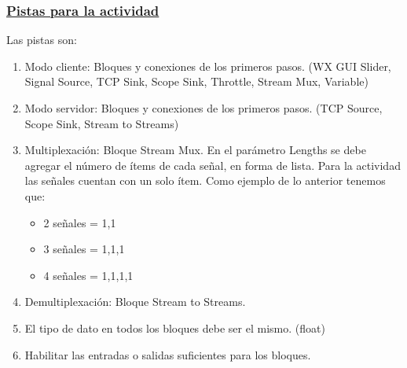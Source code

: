 \begin{frame}


\frametitle{\underline{\textbf{Pistas para la actividad}}}

Las pistas son:
\begin{enumerate}[1.]
	\item {Modo cliente: Bloques y conexiones de los primeros pasos. (WX GUI Slider, Signal Source, TCP Sink, Scope Sink, Throttle, Stream Mux, Variable)}
	
	\item {Modo servidor:  Bloques y conexiones de los primeros pasos. (TCP Source, Scope Sink, Stream to Streams)}
	\item {Multiplexación: Bloque Stream Mux. En el parámetro Lengths se debe agregar el número de ítems de cada señal, en forma de lista. Para la actividad las señales cuentan con un solo ítem. 
	Como ejemplo de lo anterior tenemos que: }
\begin{itemize}
	\item 2 señales = 1,1    
	\item 3 señales = 1,1,1 
	\item 4 señales = 1,1,1,1
\end{itemize}
	\item {Demultiplexación: Bloque Stream to Streams.}
    \item { El tipo de dato en todos los bloques debe ser el mismo. (float)}
	\item {Habilitar las entradas o salidas suficientes para los bloques.}
\end{enumerate}
\end{frame}



